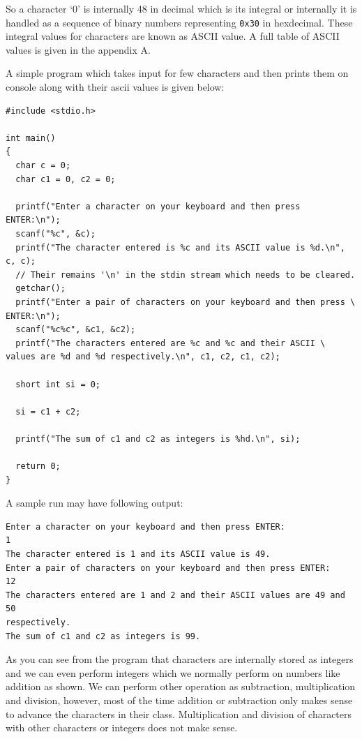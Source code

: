 So a character `0' is internally 48 in decimal which is its integral or
internally it is handled as a sequence of binary numbers representing
\texttt{0x30} in hexdecimal. These integral values for characters are known as
ASCII value. A full table of ASCII values is given in the appendix A.

A simple program which takes input for few characters and then prints them on
console along with their ascii values is given below:

\begin{Verbatim}[frame=single]
#include <stdio.h>

int main()
{
  char c = 0;
  char c1 = 0, c2 = 0;

  printf("Enter a character on your keyboard and then press ENTER:\n");
  scanf("%c", &c);
  printf("The character entered is %c and its ASCII value is %d.\n", c, c);
  // Their remains '\n' in the stdin stream which needs to be cleared.
  getchar();
  printf("Enter a pair of characters on your keyboard and then press \
ENTER:\n");
  scanf("%c%c", &c1, &c2);
  printf("The characters entered are %c and %c and their ASCII \
values are %d and %d respectively.\n", c1, c2, c1, c2);

  short int si = 0;

  si = c1 + c2;

  printf("The sum of c1 and c2 as integers is %hd.\n", si);

  return 0;
}
\end{Verbatim}

A sample run may have following output:

\begin{Verbatim}[frame=single]
Enter a character on your keyboard and then press ENTER:
1
The character entered is 1 and its ASCII value is 49.
Enter a pair of characters on your keyboard and then press ENTER:
12
The characters entered are 1 and 2 and their ASCII values are 49 and 50
respectively.
The sum of c1 and c2 as integers is 99.
\end{Verbatim}

As you can see from the program that characters are internally stored as
integers and we can even perform integers which we normally perform on
numbers like addition as shown. We can perform other operation as subtraction,
multiplication and division, however, most of the time addition or subtraction
only makes sense to advance the characters in their class. Multiplication and
division of characters with other characters or integers does not make sense.

